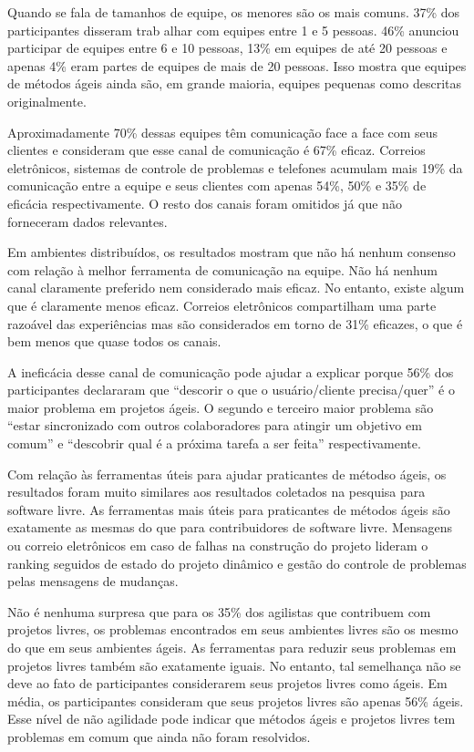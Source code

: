 Quando se fala de tamanhos de equipe, os menores são os mais
comuns. 37\% dos participantes disseram trab alhar com equipes entre 1
e 5 pessoas. 46\% anunciou participar de equipes entre 6 e 10 pessoas,
13\% em equipes de até 20 pessoas e apenas 4\% eram partes de equipes
de mais de 20 pessoas. Isso mostra que equipes de métodos ágeis ainda
são, em grande maioria, equipes pequenas como descritas originalmente.

Aproximadamente 70\% dessas equipes têm comunicação face a face com
seus clientes e consideram que esse canal de comunicação é 67\%
eficaz. Correios eletrônicos, sistemas de controle de problemas e
telefones acumulam mais 19\% da comunicação entre a equipe e seus
clientes com apenas 54\%, 50\% e 35\% de eficácia respectivamente. O
resto dos canais foram omitidos já que não forneceram dados
relevantes.

Em ambientes distribuídos, os resultados mostram que não há nenhum
consenso com relação à melhor ferramenta de comunicação na equipe. Não
há nenhum canal claramente preferido nem considerado mais eficaz. No
entanto, existe algum que é claramente menos eficaz. Correios
eletrônicos compartilham uma parte razoável das experiências mas são
considerados em torno de 31\% eficazes, o que é bem menos que quase
todos os canais.

A ineficácia desse canal de comunicação pode ajudar a explicar porque
56\% dos participantes declararam que ``descorir o que o
usuário/cliente precisa/quer'' é o maior problema em projetos ágeis. O
segundo e terceiro maior problema são ``estar sincronizado com outros
colaboradores para atingir um objetivo em comum'' e ``descobrir qual é
a próxima tarefa a ser feita'' respectivamente.

Com relação às ferramentas úteis para ajudar praticantes de métodso
ágeis, os resultados foram muito similares aos resultados coletados na
pesquisa para software livre. As ferramentas mais úteis para
praticantes de métodos ágeis são exatamente as mesmas do que para
contribuidores de software livre. Mensagens ou correio eletrônicos em
caso de falhas na construção do projeto lideram o ranking seguidos de
estado do projeto dinâmico e gestão do controle de problemas pelas
mensagens de mudanças.

Não é nenhuma surpresa que para os 35\% dos agilistas que contribuem
com projetos livres, os problemas encontrados em seus ambientes livres
são os mesmo do que em seus ambientes ágeis. As ferramentas para
reduzir seus problemas em projetos livres também são exatamente
iguais. No entanto, tal semelhança não se deve ao fato de
participantes considerarem seus projetos livres como ágeis. Em média,
os participantes consideram que seus projetos livres são apenas 56\%
ágeis. Esse nível de não agilidade pode indicar que métodos ágeis e
projetos livres tem problemas em comum que ainda não foram resolvidos.
